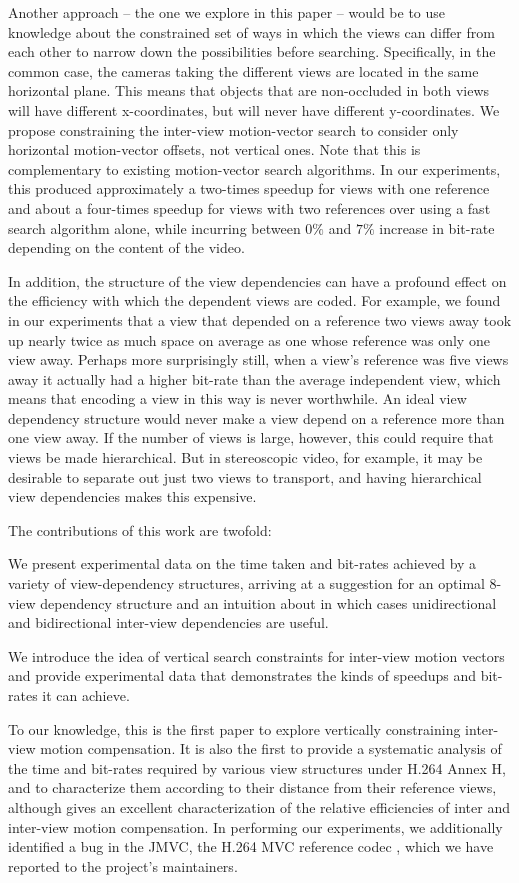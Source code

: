 \documentclass{sig-alternate-05-2015}
\begin{document}
Another approach -- the one we explore in this paper -- would be to use
knowledge about the constrained set of ways in which the views can differ from
each other to narrow down the possibilities before searching. Specifically,
in the common case, the cameras taking the different views are located in the
same horizontal plane. This means that objects that are non-occluded in both
views will have different x-coordinates, but will never have different
y-coordinates. We propose constraining the inter-view motion-vector search to
consider only horizontal motion-vector offsets, not vertical ones. Note that
this is complementary to existing motion-vector search algorithms. In our
experiments, this produced approximately a two-times speedup for views with
one reference and about a four-times speedup for views with two references
over using a fast search algorithm alone, while incurring between $0\%$ and
$7\%$ increase in bit-rate depending on the content of the video.

In addition, the structure of the view dependencies can have a profound effect
on the efficiency with which the dependent views are coded. For example, we
found in our experiments that a view that depended on a reference two views away
took up nearly twice as much space on average as one whose reference was only
one view away. Perhaps more surprisingly still, when a view's reference was five
views away it actually had a higher bit-rate than the average independent view,
which means that encoding a view in this way is never worthwhile. An ideal view
dependency structure would never make a view depend on a reference more than one
view away. If the number of views is large, however, this could require that
views be made hierarchical. But in stereoscopic video, for example, it may be
desirable to separate out just two views to transport, and having hierarchical
view dependencies makes this expensive.

The contributions of this work are twofold: \begin{compactitem}
\item We present experimental data on the time taken and bit-rates achieved by a
variety of view-dependency structures, arriving at a suggestion for an optimal
8-view dependency structure and an intuition about in which cases unidirectional
and bidirectional inter-view dependencies are useful.
\item We introduce the idea of vertical search constraints for inter-view motion
vectors and provide experimental data that demonstrates the kinds of speedups
and bit-rates it can achieve. \end{compactitem} To our knowledge, this is the
first paper to explore vertically constraining inter-view motion compensation.
It is also the first to provide a systematic analysis of the time and bit-rates
required by various view structures under H.264 Annex H, and to  characterize
them according to their distance from their reference views, although
\cite{merkle:efficient} gives an excellent characterization of the relative
efficiencies of inter and inter-view motion compensation. In performing our
experiments, we additionally identified a bug in the JMVC, the H.264 MVC
reference codec \cite{schwarz:jmvc}, which we have reported to the project's
maintainers.
\end{document}
